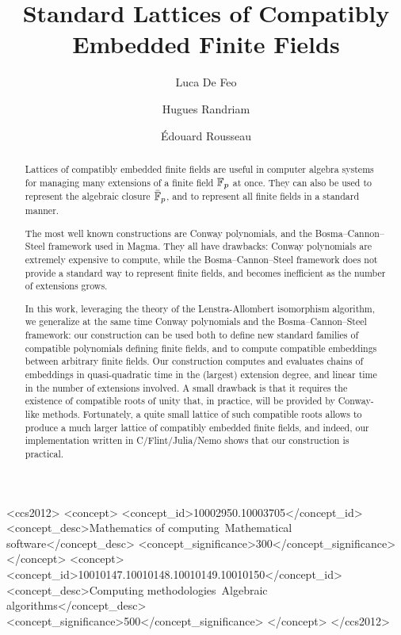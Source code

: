 \documentclass[sigconf]{acmart}
\begin{document}
\title{Standard Lattices of Compatibly Embedded Finite Fields}

\author{Luca De Feo}
\author{Hugues Randriam}
\author{\'Edouard Rousseau}

\begin{abstract}
  Lattices of compatibly embedded finite fields are useful in computer
  algebra systems for managing many extensions of a finite field
  $\mathbb{F}_p$ at once. %
  They can also be used to represent the algebraic closure $\bar{\mathbb{F}}_p$,
  and to represent all finite fields in a standard manner.

  The most well known constructions are Conway polynomials, and the
  Bosma--Cannon--Steel framework used in Magma. %
  They all have drawbacks: Conway polynomials are extremely expensive
  to compute, while the Bosma--Cannon--Steel framework does not provide
  a standard way to represent finite fields, and becomes inefficient
  as the number of extensions grows.

  In this work, leveraging the theory of the Lenstra-Allom\-bert
  isomorphism algorithm, we generalize at the same time Conway
  polynomials and the Bosma--Cannon--Steel framework: our construction
  can be used both to define new standard families of compatible
  polynomials defining finite fields, and to compute compatible
  embeddings between arbitrary finite fields. %
  Our construction computes and evaluates chains of embeddings in
  quasi-quadratic time in the (largest) extension degree, and linear
  time in the number of extensions involved. %
  A small drawback is that it requires the existence of
  compatible roots of unity that, in practice, will be provided by Conway-like methods.
  Fortunately, a quite small lattice of such compatible roots allows to produce
  a much larger lattice of compatibly embedded finite fields,
  and indeed, our implementation written in C/Flint/Julia/Nemo shows
  that our construction is practical.
\end{abstract}

\begin{CCSXML}
<ccs2012>
<concept>
<concept_id>10002950.10003705</concept_id>
<concept_desc>Mathematics of computing~Mathematical software</concept_desc>
<concept_significance>300</concept_significance>
</concept>
<concept>
<concept_id>10010147.10010148.10010149.10010150</concept_id>
<concept_desc>Computing methodologies~Algebraic algorithms</concept_desc>
<concept_significance>500</concept_significance>
</concept>
</ccs2012>
\end{CCSXML}
\end{document}
